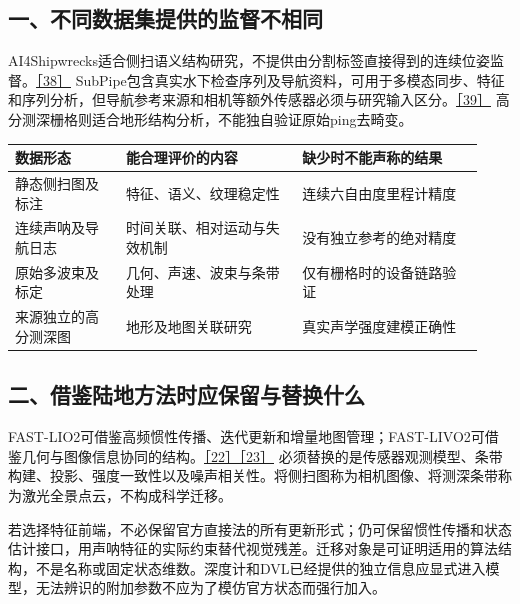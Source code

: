 \hypertarget{ux4e00ux4e0dux540cux6570ux636eux96c6ux63d0ux4f9bux7684ux76d1ux7763ux4e0dux76f8ux540c}{%
\subsection{一、不同数据集提供的监督不相同}\label{ux4e00ux4e0dux540cux6570ux636eux96c6ux63d0ux4f9bux7684ux76d1ux7763ux4e0dux76f8ux540c}}

AI4Shipwrecks适合侧扫语义结构研究，不提供由分割标签直接得到的连续位姿监督。\href{https://arxiv.org/abs/2401.14546}{［38］} SubPipe包含真实水下检查序列及导航资料，可用于多模态同步、特征和序列分析，但导航参考来源和相机等额外传感器必须与研究输入区分。\href{https://github.com/remaro-network/SubPipe-dataset}{［39］} 高分测深栅格则适合地形结构分析，不能独自验证原始ping去畸变。

\begin{longtable}[]{@{}p{0.22\linewidth}p{0.35\linewidth}p{0.36\linewidth}@{}}
\toprule
数据形态 & 能合理评价的内容 & 缺少时不能声称的结果\tabularnewline
\midrule
\endhead
静态侧扫图及标注 & 特征、语义、纹理稳定性 & 连续六自由度里程计精度\tabularnewline
连续声呐及导航日志 & 时间关联、相对运动与失效机制 & 没有独立参考的绝对精度\tabularnewline
原始多波束及标定 & 几何、声速、波束与条带处理 & 仅有栅格时的设备链路验证\tabularnewline
来源独立的高分测深图 & 地形及地图关联研究 & 真实声学强度建模正确性\tabularnewline
\bottomrule
\end{longtable}

\hypertarget{ux4e8cux501fux9274ux9646ux5730ux65b9ux6cd5ux65f6ux5e94ux4fddux7559ux4e0eux66ffux6362ux4ec0ux4e48}{%
\subsection{二、借鉴陆地方法时应保留与替换什么}\label{ux4e8cux501fux9274ux9646ux5730ux65b9ux6cd5ux65f6ux5e94ux4fddux7559ux4e0eux66ffux6362ux4ec0ux4e48}}

FAST-LIO2可借鉴高频惯性传播、迭代更新和增量地图管理；FAST-LIVO2可借鉴几何与图像信息协同的结构。\href{https://arxiv.org/abs/2107.06829}{［22］}\href{https://arxiv.org/abs/2408.14035}{［23］} 必须替换的是传感器观测模型、条带构建、投影、强度一致性以及噪声相关性。将侧扫图称为相机图像、将测深条带称为激光全景点云，不构成科学迁移。

若选择特征前端，不必保留官方直接法的所有更新形式；仍可保留惯性传播和状态估计接口，用声呐特征的实际约束替代视觉残差。迁移对象是可证明适用的算法结构，不是名称或固定状态维数。深度计和DVL已经提供的独立信息应显式进入模型，无法辨识的附加参数不应为了模仿官方状态而强行加入。

